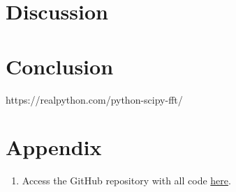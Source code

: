 \documentclass{article}
\begin{document}
\section{Discussion}

\section{Conclusion}

\begin{thebibliography}{9} %
     https://realpython.com/python-scipy-fft/
\end{thebibliography}

\section{Appendix}
\begin{enumerate}
    \item Access the GitHub repository with all code \href{https://github.com/margheritatonon/approximation-II-assignment}{here}.
\end{enumerate}
\end{document}
